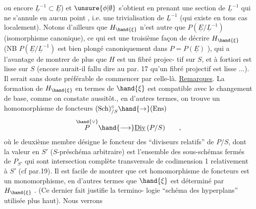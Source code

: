 
ou encore $\underline{L}^{-1}\subset\underline{E}$) et $\unsure{\phi|\emptyset}$ s'obtient en prenant une section de $\underline{L}^{-1}$ qui
ne s'annule en aucun point , i.e. une trivialisation de $\underline{L}^{-1}$
(qui existe en tous cas localement). Notons d'ailleurs que $H_{\hand{\xi}}$ n'est
autre que $P(\underline{E}/\underline{L}^{-1})$ (isomorphisme canonique), ce qui est une troisième
façon de décrire $H_{\hand{\xi}}$ (NB $P(\underline{E}/\underline{L}^{-1})$ est bien plongé canoniquement dans
$P = P(\underline{E})$ ), qui a l'avantage de montrer de plus que $H$ est un fibré projec-%
tif sur $S$, et à fortiori est lisse sur $S$ (encore aurait-il fallu dire 
 au par. 17 qu'un fibré projectif est lisse ...). Il serait sans doute
 préférable de commencer par celle-là.
\uline{Remarques}. La formation de $H_{\hand{\xi}}$ en termes de $\hand{\xi}$ est compatible avec
le changement de base, comme on constate aussitôt., en d'autres termes,
on trouve un homomorphisme de foncteurs $(\mathrm{Sch})^{\circ}_{/S}\hand{\to}(\mathrm{Ens})$
\[ \overset{\hand{\vee}}{P} \hand{\longrightarrow} \underline{\mathrm{Div}}\,(P/S) \qquad , \]
où le deuxième membre désigne le foncteur des ``diviseurs relatifs'' de $P/S$,
dont la valeur en $S'$ ($S$-préschéma arbitraire) est l'ensemble des
sous-schémas fermés de $P_{S'}$ qui sont intersection complète transversale
de codimension 1 relativement à $S'$ (cf par.19). Il est facile de montrer
que cet homomorphisme de foncteurs est un monomorphisme, en d'autres
termes que $\hand{\xi}$ est déterminé par $H_{\hand{\xi}}$ . (Ce dernier fait justifie la termino-%
logie ``schéma des hyperplans'' utilisée plus haut). Nous verrons  
